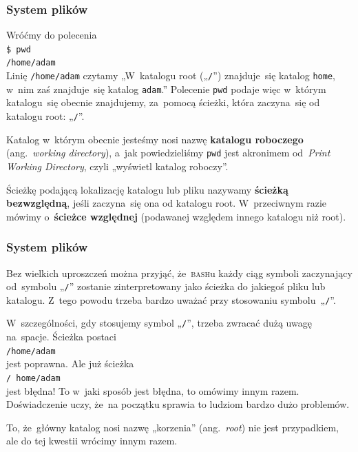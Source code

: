 \documentclass[10pt,t]{beamer}
\begin{document}





\begin{frame}
  \frametitle{System plików}


  Wróćmy do polecenia \\
  \texttt{\$ pwd} \\
  \texttt{/home/adam} \\
  Linię \texttt{/home/adam} czytamy „W~katalogu root („\texttt{/}”)
  znajduje~się katalog \texttt{home}, w~nim zaś znajduje~się katalog
  \texttt{adam}.” Polecenie \texttt{pwd} podaje więc w~którym katalogu~się
  obecnie znajdujemy, za~pomocą ścieżki, która zaczyna~się od katalogu root:
  „\texttt{/}”.

  Katalog w~którym obecnie jesteśmy nosi nazwę \textbf{katalogu roboczego}
  (ang.~\textit{working directory}), a~jak powiedzieliśmy \texttt{pwd} jest
  akronimem od~\textit{Print Working Directory}, czyli „wyświetl katalog
  roboczy”.

  Ścieżkę podającą lokalizację katalogu lub pliku nazywamy
  \textbf{ścieżką bezwzględną}, jeśli zaczyna~się ona od katalogu root.
  W~przeciwnym razie mówimy o~\textbf{ścieżce względnej} (podawanej
  względem innego katalogu niż root).

\end{frame}





\begin{frame}
  \frametitle{System plików}


  Bez wielkich uproszczeń można przyjąć, że~\textsc{bash}u \alert{każdy}
  ciąg symboli zaczynający od~symbolu „\texttt{/}” zostanie zinterpretowany
  jako ścieżka do jakiegoś pliku lub katalogu. Z~tego powodu trzeba
  \alert{bardzo} uważać przy stosowaniu symbolu~„\texttt{/}”.

  W~szczególności, gdy stosujemy symbol „\texttt{/}”, trzeba zwracać dużą
  uwagę na~spacje. Ścieżka postaci \\
  \texttt{/home/adam} \\
  jest poprawna. Ale już ścieżka \\
  \texttt{/ home/adam} \\
  jest \alert{błędna}! To w~jaki sposób jest błędna, to omówimy innym
  razem. Doświadczenie uczy, że~na początku sprawia to ludziom
  bardzo dużo problemów.

  To, że~główny katalog nosi nazwę „korzenia” (ang.~\textit{root}) nie jest
  przypadkiem, ale do tej kwestii wrócimy innym razem.

\end{frame}
\end{document}
